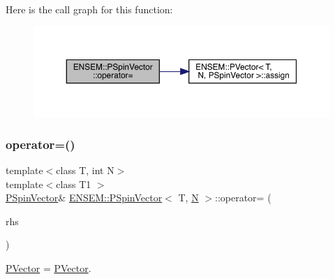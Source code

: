 Here is the call graph for this function\+:
\nopagebreak
\begin{figure}[H]
\begin{center}
\leavevmode
\includegraphics[width=350pt]{d0/dce/classENSEM_1_1PSpinVector_aff99857da5f6f68093f04c9df5355e84_cgraph}
\end{center}
\end{figure}
\mbox{\label{classENSEM_1_1PSpinVector_a6c7a984a7ab5ad8939e0a9bc57a93660}} 
\subsubsection{\texorpdfstring{operator=()}{operator=()}\hspace{0.1cm}{\footnotesize\ttfamily [4/6]}}
{\footnotesize\ttfamily template$<$class T, int N$>$ \\
template$<$class T1 $>$ \\
\mbox{\hyperlink{classENSEM_1_1PSpinVector}{P\+Spin\+Vector}}\& \mbox{\hyperlink{classENSEM_1_1PSpinVector}{E\+N\+S\+E\+M\+::\+P\+Spin\+Vector}}$<$ T, \mbox{\hyperlink{adat__devel_2lib_2hadron_2operator__name__util_8cc_a7722c8ecbb62d99aee7ce68b1752f337}{N}} $>$\+::operator= (\begin{DoxyParamCaption}\item[{const \mbox{\hyperlink{classENSEM_1_1PSpinVector}{P\+Spin\+Vector}}$<$ T1, \mbox{\hyperlink{adat__devel_2lib_2hadron_2operator__name__util_8cc_a7722c8ecbb62d99aee7ce68b1752f337}{N}} $>$ \&}]{rhs }\end{DoxyParamCaption})\hspace{0.3cm}{\ttfamily [inline]}}



\mbox{\hyperlink{classENSEM_1_1PVector}{P\+Vector}} = \mbox{\hyperlink{classENSEM_1_1PVector}{P\+Vector}}. 

